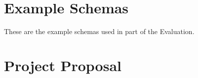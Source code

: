 \documentclass[12pt,twoside,notitlepage]{report}
\begin{document}
\cleardoublepage




\cleardoublepage

\begin{appendix}

\chapter{Example Schemas}
\label{appendix:schemas}

These are the example schemas used in part of the Evaluation. 



\cleardoublepage

\chapter{Project Proposal}



\end{appendix}
\end{document}
